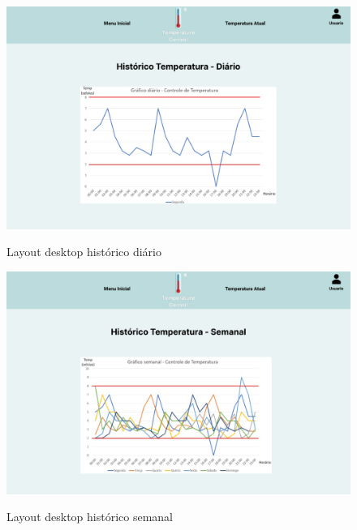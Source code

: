     \begin{figure}[ht]
        \caption{Layout desktop histórico diário}
        \centering
        \includegraphics[scale=0.35]{img/desktop/temp_diaria.jpeg}
        \label{fig:desktopTempDiaria}
    \end{figure}

    \begin{figure}[ht]
        \caption{Layout desktop histórico semanal}
        \centering
        \includegraphics[scale=0.35]{img/desktop/temp_semanal.jpeg}
        \label{fig:desktopTempSemanal}
    \end{figure}




